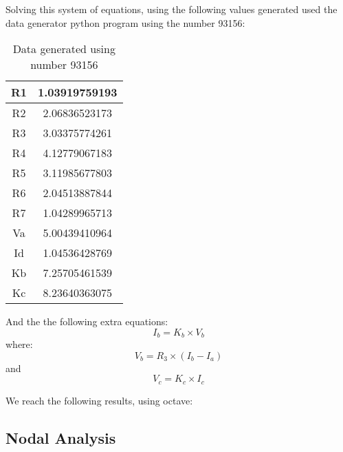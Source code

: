 Solving this system of equations, using the following values generated used the data generator python program using the number 93156:


\begin{table}[H]
  \centering
  \begin{tabular}{ c c }
    R1 & 1.03919759193 \\ 
    \hline
    R2 & 2.06836523173 \\ 
    \hline
    R3 & 3.03375774261 \\ 
    \hline
    R4 & 4.12779067183 \\ 
    \hline
    R5 & 3.11985677803 \\ 
    \hline
    R6 & 2.04513887844 \\ 
    \hline
    R7 & 1.04289965713 \\ 
    \hline
    Va & 5.00439410964 \\ 
    \hline
    Id & 1.04536428769 \\ 
    \hline
    Kb & 7.25705461539 \\ 
    \hline
    Kc & 8.23640363075 \\ 
  \end{tabular}
  \caption{Data generated using number 93156}
  \label{tab:data}
\end{table}


And the the following extra equations:
\begin{equation}
  I_b=K_b \times V_b
  \label{eq:extra1}
\end{equation}
where:
\begin{equation}
  V_b= R_3 \times (I_b-I_a)
  \label{eq:extra1}
\end{equation}
and
\begin{equation}
  V_c=K_c \times I_c
  \label{eq:extra2}
\end{equation}





We reach the following results, using octave:

    


\subsection{Nodal Analysis}


 
